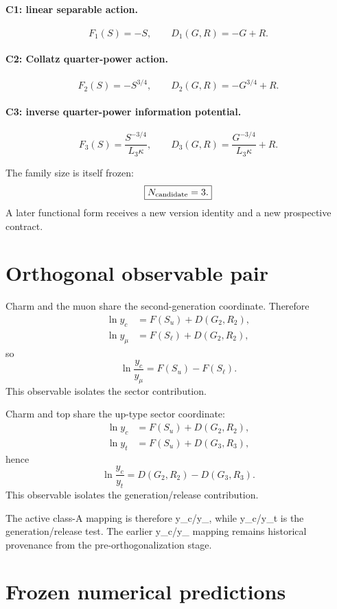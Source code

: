 \documentclass[11pt,a4paper,twoside]{book}
\def\({}%
\def\){}%
\theoremstyle{definition}
\begin{document}
\paragraph{C1: linear separable action.}
\[
F_1(S)=-S,
\qquad
D_1(G,R)=-G+R.
\]

\paragraph{C2: Collatz quarter-power action.}
\[
F_2(S)=-S^{3/4},
\qquad
D_2(G,R)=-G^{3/4}+R.
\]

\paragraph{C3: inverse quarter-power information potential.}
\[
F_3(S)=\frac{S^{-3/4}}{L_3\kappa},
\qquad
D_3(G,R)=\frac{G^{-3/4}}{L_3\kappa}+R.
\]

The family size is itself frozen:
\[
\boxed{N_{\rm candidate}=3.}
\]
A later functional form receives a new version identity and a new prospective
contract.

\section{Orthogonal observable pair}

Charm and the muon share the second-generation coordinate.  Therefore
\[
\begin{aligned}
\ln y_c&=F(S_u)+D(G_2,R_2),\\
\ln y_\mu&=F(S_\ell)+D(G_2,R_2),
\end{aligned}
\]
so
\[
\boxed{
\ln\frac{y_c}{y_\mu}=F(S_u)-F(S_\ell).
}
\]
This observable isolates the sector contribution.

Charm and top share the up-type sector coordinate:
\[
\begin{aligned}
\ln y_c&=F(S_u)+D(G_2,R_2),\\
\ln y_t&=F(S_u)+D(G_3,R_3),
\end{aligned}
\]
hence
\[
\boxed{
\ln\frac{y_c}{y_t}
=D(G_2,R_2)-D(G_3,R_3).
}
\]
This observable isolates the generation/release contribution.

The active class-A mapping is therefore \(y_c/y_\mu\), while \(y_c/y_t\) is the
generation/release test.  The earlier \(y_c/y_\tau\) mapping remains historical
provenance from the pre-orthogonalization stage.

\section{Frozen numerical predictions}
\end{document}
